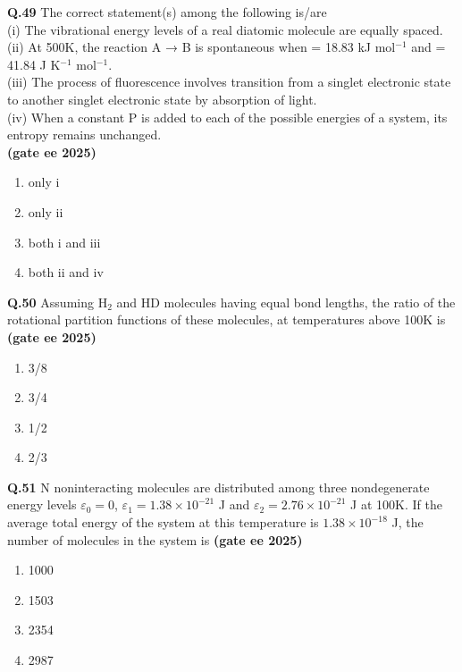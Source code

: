 \documentclass[journal,12pt,onecolumn]{exam}
\theoremstyle{remark}
\begin{document}
 \noindent\textbf{Q.49} The correct statement(s) among the following is/are \\
(i) The vibrational energy levels of a real diatomic molecule are equally spaced. \\
(ii) At 500K, the reaction A → B is spontaneous when \DeltaH = 18.83 kJ mol$^{-1}$ and \DeltaS = 41.84 J K$^{-1}$ mol$^{-1}$. \\
(iii) The process of fluorescence involves transition from a singlet electronic state to another singlet electronic state by absorption of light. \\
(iv) When a constant P is added to each of the possible energies of a system, its entropy remains unchanged. \\
\hfill{\textbf{(gate ee 2025)}}
\begin{multicols}{2}
\begin{enumerate}[label=(\Alph*)]
    \item only i
    \item only ii
    \item both i and iii
    \item both ii and iv
\end{enumerate}
\end{multicols}

\noindent\textbf{Q.50} Assuming H$_2$ and HD molecules having equal bond lengths, the ratio of the rotational partition functions of these molecules, at temperatures above 100K is \hfill{\textbf{(gate ee 2025)}}
\begin{multicols}{2}
\begin{enumerate}[label=(\Alph*)]
    \item 3/8
    \item 3/4
    \item 1/2
    \item 2/3
\end{enumerate}
\end{multicols}

\noindent\textbf{Q.51} N noninteracting molecules are distributed among three nondegenerate energy levels $\varepsilon_0 = 0$, $\varepsilon_1 = 1.38 \times 10^{-21}$ J and $\varepsilon_2 = 2.76 \times 10^{-21}$ J at 100K. If the average total energy of the system at this temperature is $1.38 \times 10^{-18}$ J, the number of molecules in the system is \hfill{\textbf{(gate ee 2025)}}
\begin{multicols}{2}
\begin{enumerate}[label=(\Alph*)]
    \item 1000
    \item 1503
    \item 2354
    \item 2987
\end{enumerate}
\end{multicols} 
\vspace{1 cm}
\end{document}
